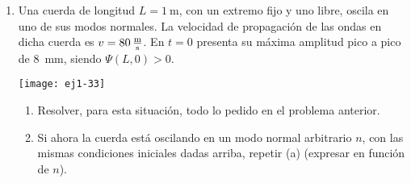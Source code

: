 \documentclass[11pt,spanish,a4paper]{article}
\begin{document}
\begin{enumerate}
\item 
\begin{minipage}[t][2.6cm]{0.6\textwidth}
Una cuerda de longitud $L = \SI{1}{\metre}$, con un extremo fijo y uno libre, oscila en uno de sus modos normales.
La velocidad de propagación de las ondas en dicha cuerda es \(v= \SI{80}{\metre\over\second}\).
En \(t = 0\) presenta su máxima amplitud pico a pico de \SI{8}{\milli\metre}, siendo $\Psi(L,0) > 0$.
\end{minipage}
\begin{minipage}[c][0.4cm][t]{0.34\textwidth}
	\texttt{[image: ej1-33]}
\end{minipage}
\begin{enumerate}
	\item Resolver, para esta situación, todo lo pedido en el problema anterior. 
	\item Si ahora la cuerda está oscilando en un modo normal arbitrario $n$, con las mismas condiciones iniciales dadas arriba, repetir (a) (expresar en función de $n$).
\end{enumerate}



\end{enumerate}
\end{document}
